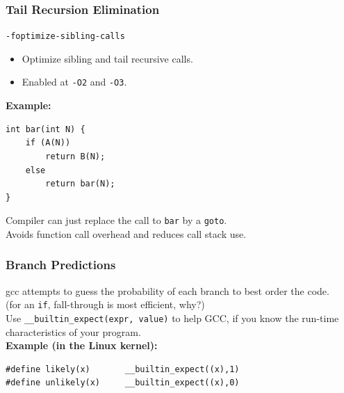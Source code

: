 \begin{frame}[fragile]
  \frametitle{Tail Recursion Elimination}

  

  {\tt -foptimize-sibling-calls}

  \begin{itemize}
    \item Optimize sibling and tail recursive calls.
    \item Enabled at {\tt -O2} and {\tt -O3}.
  \end{itemize}

  {\bf Example:}

  \begin{lstlisting}
int bar(int N) {
    if (A(N))
        return B(N);
    else
        return bar(N);
}
  \end{lstlisting}

  Compiler can just replace the call to {\tt bar} by a {\tt goto}.\\
  Avoids function call overhead 
  and reduces call stack use.
  
\end{frame}

\begin{frame}[fragile]
  \frametitle{Branch Predictions}

  
     gcc attempts to guess the probability of each branch to 
      best order the code.\\
     (for an {\tt if}, fall-through is most efficient, why?)\\[1em]

     Use {\tt \_\_builtin\_expect(expr, value)} to help GCC, if
      you know the run-time characteristics of your program.\\[1em]
  {\bf Example (in the Linux kernel):}

  \begin{lstlisting}
#define likely(x)       __builtin_expect((x),1)
#define unlikely(x)     __builtin_expect((x),0)
  \end{lstlisting}
  
\end{frame}

